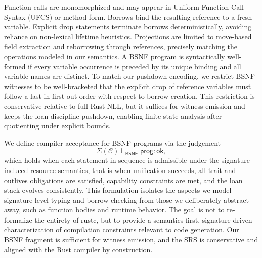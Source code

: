 \documentclass[runningheads]{llncs}
\begin{document}
Function calls are monomorphized and may appear in Uniform Function Call Syntax (UFCS) or method form. Borrows bind the resulting reference to a fresh variable.  
Explicit \textsf{drop} statements terminate borrows deterministically, avoiding reliance on non-lexical lifetime heuristics. Projections are limited to move-based field extraction and reborrowing through references, precisely matching the operations modeled in our semantics. A BSNF program is syntactically well-formed if every variable occurrence is preceded by its unique binding and all variable names are distinct. To match our pushdown encoding, we restrict BSNF witnesses to be well-bracketed that the explicit \textsf{drop} of reference variables must follow a last-in-first-out order with respect to borrow creation. This restriction is conservative relative to full Rust NLL, but it suffices for witness emission and keeps the loan discipline pushdown, enabling finite-state analysis after quotienting under explicit bounds.

We define compiler acceptance for BSNF programs via the judgement
\begin{equation*}
    \Sigma(\mathcal{C}) \vdash_{\textsf{BSNF}} \textsf{prog}:\textsf{ok},
\end{equation*}
which holds when each statement in sequence is admissible under the signature-induced resource semantics, that is when unification succeeds, all trait and outlives obligations are satisfied, capability constraints are met, and the loan stack evolves consistently. This formulation isolates the aspects we model signature-level typing and borrow checking from those we deliberately abstract away, such as function bodies and runtime behavior. The goal is not to re-formalize the entirety of rustc, but to provide a semantics-first, signature-driven characterization of compilation constraints relevant to code generation.  
Our BSNF fragment is sufficient for witness emission, and the SRS is conservative and aligned with the Rust compiler by construction.
\end{document}
